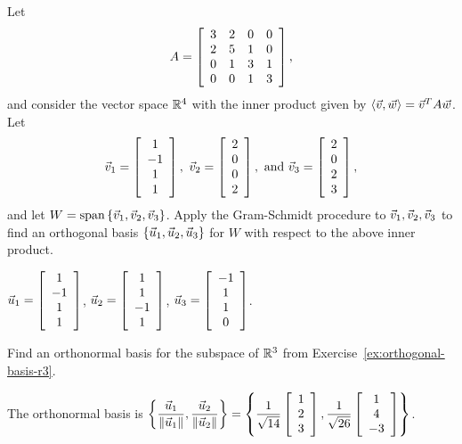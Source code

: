 \documentclass{ximera}
\begin{document}
\begin{exercise}
  Let
  \begin{equation*}
    A = \startmat{cccc}
      3 & 2 & 0 & 0 \\
      2 & 5 & 1 & 0 \\
      0 & 1 & 3 & 1 \\
      0 & 0 & 1 & 3 \\
    \stopmat,
  \end{equation*}
  and consider the vector space $\R^4$ with the inner product given by
  $\iprod{\vect{v},\vect{w}} = \vect{v}^T A\vect{w}$.
  Let
  \begin{equation*}
    \vect{v}_1 = \startmat{c} 1 \\ -1 \\ 1 \\ 1 \stopmat,
    \quad
    \vect{v}_2 = \startmat{c} 2 \\ 0 \\ 0 \\ 2 \stopmat,
    \quad\mbox{and}\quad
    \vect{v}_3 = \startmat{c} 2 \\ 0 \\ 2 \\ 3 \stopmat,
  \end{equation*}
  and let $W=\sspan\set{\vect{v}_1,\vect{v}_2,\vect{v}_3}$.  Apply the
  Gram-Schmidt procedure to $\vect{v}_1,\vect{v}_2,\vect{v}_3$ to find
  an orthogonal basis $\set{\vect{u}_1,\vect{u}_2,\vect{u}_3}$ for $W$
  with respect to the above inner product.
  \begin{solution}
    $\vect{u}_1 = \startmat{c} 1 \\ -1 \\ 1 \\ 1 \stopmat$,
    $\vect{u}_2 = \startmat{c} 1 \\ 1 \\ -1 \\ 1 \stopmat$,
    $\vect{u}_3 = \startmat{c} -1 \\ 1 \\ 1 \\ 0 \stopmat$.
  \end{solution}
\end{exercise}

\begin{exercise}
  Find an orthonormal basis for the subspace of $\R^3$ from Exercise~\ref{ex:orthogonal-basis-r3}.
  \begin{solution}
    The orthonormal basis is $\displaystyle\set{
      \frac{\vect{u}_1}{\norm{\vect{u}_1}},
      \frac{\vect{u}_2}{\norm{\vect{u}_2}}
    } = \set{
      \frac{1}{\sqrt{14}} \startmat{c} 1 \\ 2 \\ 3 \stopmat,
      \frac{1}{\sqrt{26}} \startmat{c} 1 \\ 4 \\
        -3 \stopmat
    }$.
  \end{solution}
\end{exercise}
\end{document}

